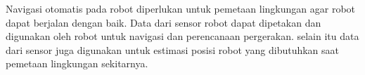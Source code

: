  Navigasi otomatis pada robot diperlukan untuk pemetaan lingkungan agar robot dapat berjalan dengan baik. Data dari sensor robot dapat dipetakan dan digunakan oleh robot untuk navigasi dan perencanaan pergerakan. selain itu data dari sensor juga digunakan untuk estimasi posisi robot yang dibutuhkan saat pemetaan lingkungan sekitarnya.

 

